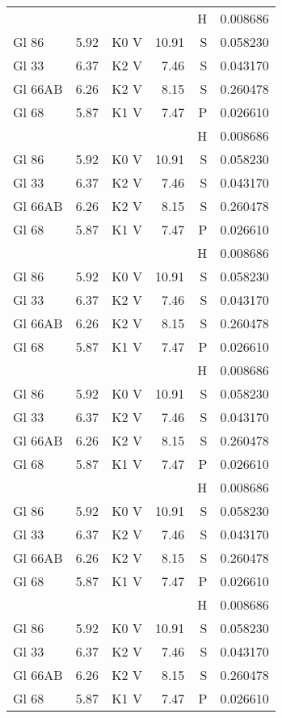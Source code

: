 \documentclass{aa}
\begin{document}
{\begin{landscape}
\begin{longtable}{lllrrr}
         &      &      &      & H & 0.008686\\
Gl 86    & 5.92 & K0 V & 10.91& S & 0.058230\\   Gl 33    & 6.37 & K2 V & 7.46 & S & 0.043170\\
Gl 66AB  & 6.26 & K2 V & 8.15 & S & 0.260478\\
Gl 68    & 5.87 & K1 V & 7.47 & P & 0.026610\\
         &      &      &      & H & 0.008686\\
Gl 86    & 5.92 & K0 V & 10.91& S & 0.058230\\   Gl 33    & 6.37 & K2 V & 7.46 & S & 0.043170\\
Gl 66AB  & 6.26 & K2 V & 8.15 & S & 0.260478\\
Gl 68    & 5.87 & K1 V & 7.47 & P & 0.026610\\
         &      &      &      & H & 0.008686\\
Gl 86    & 5.92 & K0 V & 10.91& S & 0.058230\\   Gl 33    & 6.37 & K2 V & 7.46 & S & 0.043170\\
Gl 66AB  & 6.26 & K2 V & 8.15 & S & 0.260478\\
Gl 68    & 5.87 & K1 V & 7.47 & P & 0.026610\\
         &      &      &      & H & 0.008686\\
Gl 86    & 5.92 & K0 V & 10.91& S & 0.058230\\   Gl 33    & 6.37 & K2 V & 7.46 & S & 0.043170\\
Gl 66AB  & 6.26 & K2 V & 8.15 & S & 0.260478\\
Gl 68    & 5.87 & K1 V & 7.47 & P & 0.026610\\
         &      &      &      & H & 0.008686\\
Gl 86    & 5.92 & K0 V & 10.91& S & 0.058230\\   Gl 33    & 6.37 & K2 V & 7.46 & S & 0.043170\\
Gl 66AB  & 6.26 & K2 V & 8.15 & S & 0.260478\\
Gl 68    & 5.87 & K1 V & 7.47 & P & 0.026610\\
         &      &      &      & H & 0.008686\\
Gl 86    & 5.92 & K0 V & 10.91& S & 0.058230\\   Gl 33    & 6.37 & K2 V & 7.46 & S & 0.043170\\
Gl 66AB  & 6.26 & K2 V & 8.15 & S & 0.260478\\
Gl 68    & 5.87 & K1 V & 7.47 & P & 0.026610\\

\end{longtable}
\end{landscape}}
\end{document}
